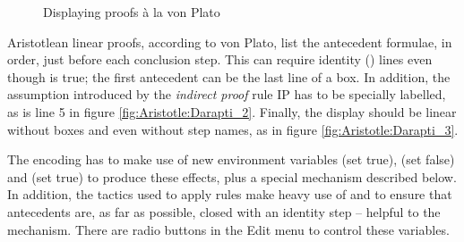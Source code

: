 \begin{figure}
{\label{fig:Aristotle:Darapti_3}}
\caption{Displaying proofs \`a la von Plato}
\label{fig:Aristotle:Darapti_various}
\end{figure}
Aristotlean linear proofs, according to von Plato, list the antecedent formulae, in order, just before each conclusion step. This can require identity () lines even though  is true; the first antecedent can be the last line of a box. In addition, the assumption introduced by the \emph{indirect proof} rule IP has to be specially labelled, as is line 5 in figure \ref{fig:Aristotle:Darapti_2}. Finally, the display should be linear without boxes and even without step names, as in figure \ref{fig:Aristotle:Darapti_3}.

The encoding has to make use of new environment variables  (set true),  (set false) and  (set true) to produce these effects, plus a special  mechanism described below. In addition, the tactics used to apply rules make heavy use of  and  to ensure that antecedents are, as far as possible, closed with an identity step -- helpful to the  mechanism. There are radio buttons in the Edit menu to control these variables.

